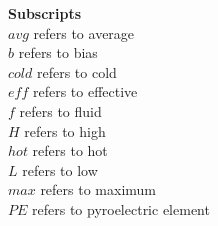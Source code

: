 \begin{tabbing}
\textbf{Subscripts} \\
$avg$ \>  refers to average \\
$b$ \>      refers to bias \\
$cold$ \>  refers to cold \\
$eff$ \>   refers to effective \\
$f$ \>      refers to fluid \\
$H$ \>    refers to high \\
$hot$ \>   refers to hot \\
$L$ \>    refers to low \\
$max$  \>   refers to maximum \\
$PE$ \>    refers to pyroelectric element \\
\end{tabbing}




